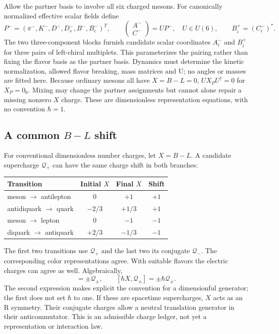 Allow the partner basis to involve all six charged mesons. For canonically
normalized effective scalar fields define
\begin{equation}
 P^-=(\pi^-,K^-,D^-,D_s^-,B^-,B_c^-)^T,\qquad
 \begin{pmatrix} A^-\\ C^-\end{pmatrix}=U P^-,\quad U\in U(6),
 \qquad B_i^+=(C_i^-)^* .
\end{equation}
The two three-component blocks furnish candidate scalar coordinates $A_i^-$
and $B_i^+$ for three pairs of left-chiral multiplets. This parameterizes
the pairing rather than fixing the flavor basis as the partner basis.
Dynamics must determine the kinetic normalization, allowed flavor breaking,
mass matrices and U; no angles or masses are fitted here. Because ordinary
mesons all have $X=B-L=0$, $UX_PU^\dagger=0$ for $X_P=0_6$.
Mixing may change the partner assignments but cannot alone repair a missing
nonzero $X$ charge. These are dimensionless representation equations, with
no convention $\hbar=1$.

\subsection{A common \texorpdfstring{$B-L$}{B minus L} shift}
For conventional dimensionless number charges, let $X=B-L$. A candidate
supercharge $\mathcal Q_+$ can have the same charge shift in both branches:
\begin{center}
\begin{tabular}{lccc}
\toprule
Transition & Initial $X$ & Final $X$ & Shift\\
\midrule
meson $\to$ antilepton & $0$ & $+1$ & $+1$\\
antidiquark $\to$ quark & $-2/3$ & $+1/3$ & $+1$\\
meson $\to$ lepton & $0$ & $-1$ & $-1$\\
diquark $\to$ antiquark & $+2/3$ & $-1/3$ & $-1$\\
\bottomrule
\end{tabular}
\end{center}
The first two transitions use $\mathcal Q_+$ and the last two its conjugate
$\mathcal Q_-$. The corresponding color representations agree. With suitable
flavors the electric charges can agree as well. Algebraically,
\begin{equation}
 [X,\mathcal Q_\pm]=\pm\mathcal Q_\pm,
 \qquad [\hbar X,\mathcal Q_\pm]=\pm\hbar\mathcal Q_\pm.
\end{equation}
The second expression makes explicit the convention for a dimensionful
generator; the first does not set $\hbar$ to one. If these are spacetime
supercharges, $X$ acts as an R symmetry. Their conjugate charges allow a
neutral translation generator in their anticommutator. This is an admissible
charge ledger, not yet a representation or interaction law.

